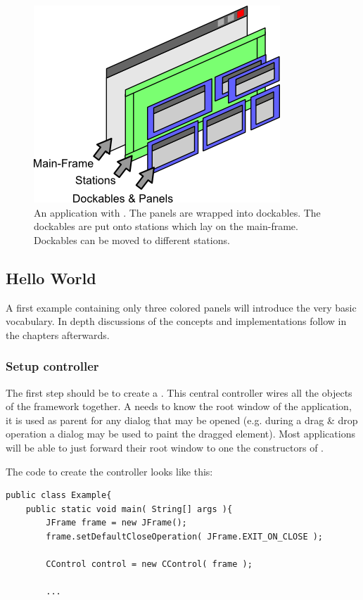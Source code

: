 \begin{figure}[ht]
\centering
\includegraphics[scale=1]{basics/app_with}
\caption{An application with . The panels are wrapped into dockables. The dockables are put onto stations which lay on the main-frame. Dockables can be moved to different stations.}
\label{fig:app_with}
\end{figure}

\subsection{Hello World}
A first example containing only three colored panels will introduce the very basic vocabulary. In depth discussions of the concepts and implementations follow in the chapters afterwards.

\subsubsection{Setup controller}
The first step should be to create a . This central controller wires all the objects of the framework together. A  needs to know the root window of the application, it is used as parent for any dialog that may be opened (e.g. during a drag \& drop operation a dialog may be used to paint the dragged element). Most applications will be able to just forward their root window to one the constructors of .

The code to create the controller looks like this:
\begin{lstlisting}
public class Example{
	public static void main( String[] args ){
		JFrame frame = new JFrame();
		frame.setDefaultCloseOperation( JFrame.EXIT_ON_CLOSE );
		
		CControl control = new CControl( frame );
		
		...
\end{lstlisting}

